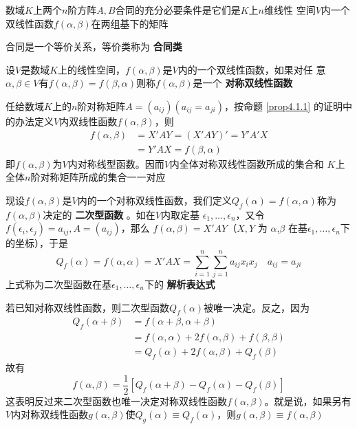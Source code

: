 \documentclass[11pt]{article}
\begin{document}
\begin{proposition}[]
数域\(K\)上两个\(n\)阶方阵\(A,B\)合同的充分必要条件是它们是\(K\)上\(n\)维线性
空间\(V\)内一个双线性函数\(f(\alpha,\beta)\)在两组基下的矩阵
\end{proposition}

合同是一个等价关系，等价类称为 \textbf{合同类}

\begin{definition}[]
设\(V\)是数域\(K\)上的线性空间，\(f(\alpha,\beta)\)是\(V\)内的一个双线性函数，如果对任
意\(\alpha,\beta\in V\)有\(f(\alpha,\beta)=f(\beta,\alpha)\)则称\(f(\alpha,\beta)\)是一个 \textbf{对称双线性函数}
\end{definition}

任给数域\(K\)上的\(n\)阶对称矩阵\(A=(a_{ij})(a_{ij}=a_{ji})\)，按命题
\ref{prop4.1.1} 的证明中的办法定义\(V\)内双线性函数\(f(\alpha,\beta)\)，则
\begin{align*}
f(\alpha,\beta)&=X'AY=(X'AY)'=Y'A'X\\
&=Y'AX=f(\beta,\alpha)
\end{align*}
即\(f(\alpha,\beta)\)为\(V\)内对称线型函数。因而\(V\)内全体对称双线性函数所成的集合和
\(K\)上全体\(n\)阶对称矩阵所成的集合一一对应

现设\(f(\alpha,\beta)\)是\(V\)内的一个对称双线性函数，我们定义\(Q_f(\alpha)=f(\alpha,\alpha)\)称为
\(f(\alpha,\beta)\)决定的 \textbf{二次型函数} 。如在\(V\)内取定基
\(\epsilon_1,\dots,\epsilon_n\)，又令
\(f(\epsilon_i,\epsilon_j)=a_{ij},A=(a_{ij})\)，那么 \(f(\alpha,\beta)=X'AY\)（\(X,Y\)
为 \(\alpha\),\(\beta\) 在基\(\epsilon_1, \dots,\epsilon_n\)下的坐标），于是
\begin{equation*}
Q_f(\alpha)=f(\alpha,\alpha)=X'AX=\sum_{i=1}^n\sum_{j=1}^na_{ij}x_ix_j\quad
a_{ij}=a_{ji}
\end{equation*}
上式称为二次型函数在基\(\epsilon_1,\dots,\epsilon_n\)下的 \textbf{解析表达式}

若已知对称双线性函数，则二次型函数\(Q_f(\alpha)\)被唯一决定。反之，因为
\begin{align*}
Q_f(\alpha+\beta)&=f(\alpha+\beta,\alpha+\beta)\\
&=f(\alpha,\alpha)+2f(\alpha,\beta)+f(\beta,\beta)\\
&=Q_f(\alpha)+2f(\alpha,\beta)+Q_f(\beta)
\end{align*}
故有
\begin{equation*}
f(\alpha,\beta)=\frac{1}{2}[Q_f(\alpha+\beta)-Q_f(\alpha)-Q_f(\beta)]
\end{equation*}
这表明反过来二次型函数也唯一决定对称双线性函数\(f(\alpha,\beta)\)。就是说，如果另有
\(V\)内对称双线性函数\(g(\alpha,\beta)\)使\(Q_g(\alpha)\equiv Q_f(\alpha)\)，则\(g(\alpha,\beta)\equiv f(\alpha,\beta)\)
\end{document}
